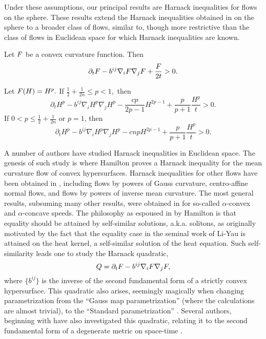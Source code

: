 \documentclass{amsart}
\begin{document}
Under these assumptions, our principal results are Harnack inequalities for flows on the sphere. These results extend the Harnack inequalities obtained in \cite{BryanIvaki:08/2015,BryanLouie:02/2015} on the sphere to a broader class of flows, similar to, though more restrictive than the class of flows in Euclidean space \cite{Andrews:09/1994} for which Harnack inequalities are known.

\begin{theorem}\label{thm:harnack}
Let $F$ be a  convex curvature function. Then
\[
\partial_t F-b^{ij}\nabla_iF\nabla_jF+\frac{F}{2t}>0.
\]

Let $F(H)=H^{p}.$ If $\frac{1}{2}+\frac{1}{2n}\leq {p}< 1,$ then
\[
\partial_t H^{p} - b^{ij}\nabla_iH^{p}\nabla_jH^{p} - \frac{c {p}}{2{p}-1}H^{2{p}-1} + \frac{{p}}{{p}+1} \frac{H^{p}}{t} > 0.
\]
If $0<{p}\leq \frac{1}{2} + \frac{1}{2n}$ or $p=1$, then
\[
\partial_t H^{p} - b^{ij}\nabla_iH^{p}\nabla_jH^{p} - c n{p}H^{2{p}-1} + \frac{{p}}{{p}+1} \frac{H^{p}}{t} > 0.
\]
\end{theorem}

A number of authors have studied Harnack inequalities in Euclidean space. The genesis of such study is \cite{Hamilton:/1995} where Hamilton proves a Harnack inequality for the mean curvature flow of convex hypersurfaces. Harnack inequalities for other flows have been obtained in \cite{Chow:06/1991,Ivaki:11/2015,Ivaki:09/2015,Li:/2011,Smoczyk:/1997}, including flows by powers of Gauss curvature, centro-affine normal flows, and flows by powers of inverse mean curvature. The most general results, subsuming many other results, were obtained in \cite{Andrews:09/1994} for so-called \(\alpha\)-convex and \(\alpha\)-concave speeds. The philosophy as espoused in \cite{Hamilton:/1995} by Hamilton is that equality should be attained by self-similar solutions, a.k.a. solitons, as originally motivated by the fact that the equality case in the seminal work of Li-Yau \cite{LiYau:/1986} is attained on the heat kernel, a self-similar solution of the heat equation. Such self-similarity leads one to study the Harnack quadratic,
\begin{equation}
\label{eq:harnack_quadratic}
Q = \partial_t F - b^{ij} \nabla_i F \nabla_j F,
\end{equation}
where $\{b^{ij}\}$ is the inverse of the second fundamental form of a strictly convex hypersurface. This quadratic also arises, seemingly magically when changing parametrization from the ``Gauss map parametrization'' (where the calculations are almost trivial), to the ``Standard parametrization'' \cite{Andrews:09/1994}. Several authors, beginning with \cite{ChowChu:06/2001} have also investigated this quadratic, relating it to the second fundamental form of a degenerate metric on space-time \cite{HelmensdorferTopping:01/2013,Kotschwar:/2009}.
\end{document}
